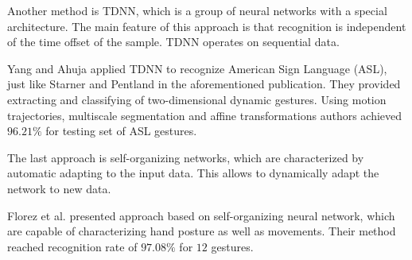 Another method is TDNN, which is a group of neural networks with a special architecture. The main feature of this approach is that recognition is independent of the time offset of the sample. TDNN operates on sequential data.

Yang and Ahuja \cite{YangAhujaComputerVision} applied TDNN to recognize American Sign Language (ASL), just like Starner and Pentland in the aforementioned publication. They provided extracting and classifying of two-dimensional dynamic gestures. Using motion trajectories, multiscale segmentation and affine transformations authors achieved $96.21\%$ for testing set of ASL gestures.

The last approach is self-organizing networks, which are characterized by automatic adapting to the input data. This allows to dynamically adapt the network to new data.

Florez et al. \cite{Florez:2002:HGR:874061.875461} presented approach based on self-organizing neural network, which are capable of characterizing hand posture as well as movements. Their method reached recognition rate of $97.08\%$ for $12$ gestures.


